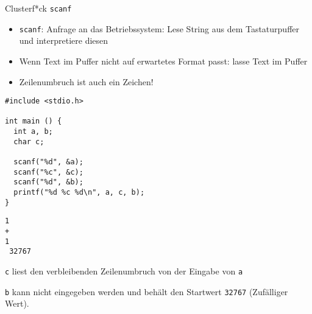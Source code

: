 \begin{frame}[fragile]{Clusterf*ck \texttt{scanf}}
%
\begin{itemize}
\item \texttt{scanf}: Anfrage an das Betriebssystem: Lese String aus dem Tastaturpuffer und interpretiere diesen
\item Wenn Text im Puffer nicht auf erwartetes Format passt: lasse Text im Puffer
\item Zeilenumbruch ist auch ein Zeichen!
\end{itemize}

\begin{tcbraster}[raster columns=2,
                  raster equal height,
                  nobeforeafter,
                  raster column skip=0.2cm]
\begin{codebox}[Szenario]
\begin{verbatim}
#include <stdio.h>

int main () {
  int a, b;
  char c;

  scanf("%d", &a);
  scanf("%c", &c);
  scanf("%d", &b);
  printf("%d %c %d\n", a, c, b);
}

\end{verbatim}
\end{codebox}
%
\begin{cmdbox}[Ausführungsbeispiel]
\begin{verbatim}
1
+
1 
 32767
\end{verbatim}

\footnotesize
\Thus \texttt{c} liest den verbleibenden Zeilenumbruch von der Eingabe von \texttt{a}

\Thus \texttt{b} \textsf{kann nicht eingegeben werden und behält den Startwert \texttt{32767} (Zufälliger Wert).}
\end{cmdbox}
\end{tcbraster}
%
\end{frame}


